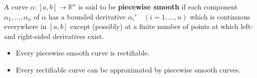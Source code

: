 \documentclass[12pt]{article}
\begin{document}
A curve $\alpha : [a, b] \rightarrow \mathbb{R}^{n}$ is said to be \textbf{piecewise smooth} if each component $\alpha_{1}, \ldots, \alpha_{n}$ of $\alpha$ has a bounded derivative $\alpha_{i}' \quad (i = 1, \ldots, n)$ which is continuous everywhere in $[a, b]$ except (possibly) at a finite number of points at which left- and right-sided  derivatives exist.

\begin{itemize}
\item Every piecewise smooth curve is rectifiable.

\item Every rectifiable curve can be approximated by piecewise smooth curves.
\end{itemize}
\end{document}
